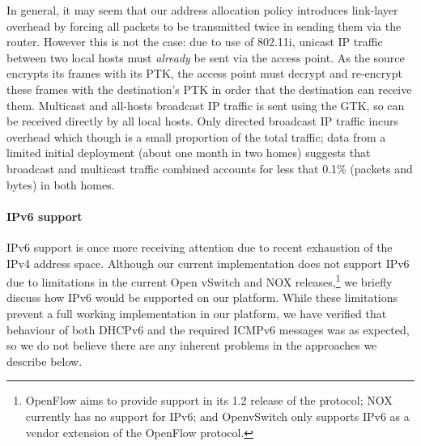 In general, it may seem that our address allocation policy introduces link-layer
overhead by forcing all packets to be transmitted twice in sending them via the
router.  However this is not the case: due to use of 802.11i, unicast IP traffic
between two local hosts must \emph{already} be sent via the access point.  As
the source encrypts its frames with its PTK, the access point must decrypt and
re-encrypt these frames with the destination's PTK in order that the destination
can receive them.  Multicast and all-hosts broadcast IP traffic is sent using
the GTK, so can be received directly by all local hosts.  Only directed
broadcast IP traffic incurs overhead which though is a small proportion of the
total traffic; data from a limited initial deployment (about one month in two
homes) suggests that broadcast and multicast traffic combined accounts for less
that 0.1\% (packets and bytes) in both homes.

\paragraph{IPv6 support} IPv6 support is once more receiving attention due to
recent exhaustion of the IPv4 address space.  Although our current
implementation does not support IPv6 due to limitations in the current Open
vSwitch and NOX releases,\footnote{OpenFlow aims to provide support in its 1.2
  release of the protocol; NOX currently has no support for IPv6; and OpenvSwitch
  only supports IPv6 as a vendor extension of the OpenFlow protocol.} we briefly
discuss how IPv6 would be supported on our platform.  While these limitations
prevent a full working implementation in our platform, we have verified that
behaviour of both DHCPv6 and the required ICMPv6 messages was as expected, so we
do not believe there are any inherent problems in the approaches we describe
below.

